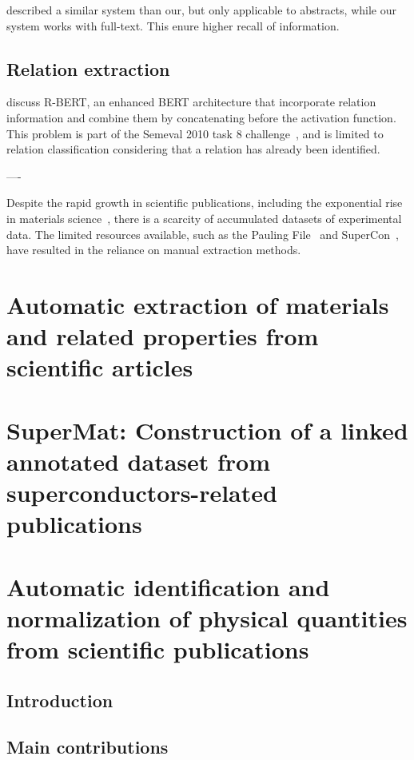 \documentclass[12pt, a4paper]{report}
\begin{document}
\cite{mitsui2023automatic} described a similar system than our, but only applicable to abstracts, while our system works with full-text. This enure higher recall of information. 



\section{Relation extraction}

\cite{wu2019enriching} discuss R-BERT, an enhanced BERT architecture that incorporate relation information and combine them by concatenating before the activation function. 
This problem is part of the Semeval 2010 task 8 challenge~\cite{hendrickx2019semeval}, and is limited to relation classification considering that a relation has already been identified.



----

Despite the rapid growth in scientific publications, including the exponential rise in materials science~\cite{Pratheepan_2019}, there is a scarcity of accumulated datasets of experimental data. 
The limited resources available, such as the Pauling File~\cite{Blokhin2018ThePF_paulingFile} and SuperCon~\cite{SuperCon}, have resulted in the reliance on manual extraction methods.



\chapter{Automatic extraction of materials and related properties from scientific articles}

\chapter{SuperMat: Construction of a linked annotated dataset from superconductors-related publications}


\chapter{Automatic identification and normalization of physical quantities from scientific publications}
\section{Introduction}
\section{Main contributions}
\end{document}
